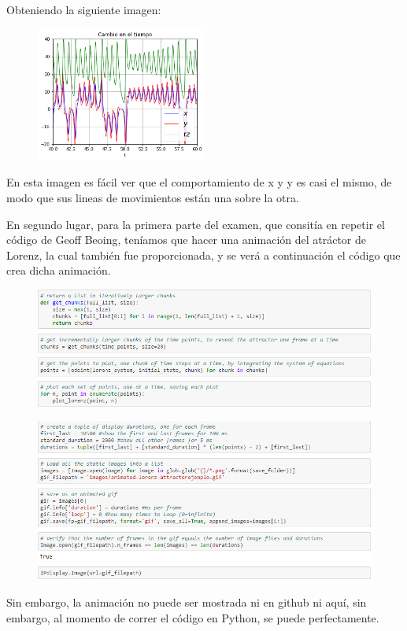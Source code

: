 \documentclass{article}
\begin{document}
Obteniendo la siguiente imagen:
\begin{figure}[H]
    \includegraphics[width=0.5\textwidth]{Grafica2.png}
    \centering
    \label{Grad}
\end{figure}
En esta imagen es fácil ver que el comportamiento de x y y es casi el mismo, de modo que sus lineas de movimientos están una sobre la otra.

En segundo lugar, para la primera parte del examen, que consitía en repetir el código de Geoff Beoing, teníamos que hacer una animación del atráctor de Lorenz, la cual también fue proporcionada, y se verá a continuación el código que crea dicha animación.
\begin{figure}[H]
    \includegraphics[width=1\textwidth]{Celda8.PNG}
    \centering
    \label{Cod}
\end{figure}
\begin{figure}[H]
    \includegraphics[width=1\textwidth]{Celda9.PNG}
    \centering
    \label{Cod}
\end{figure}
Sin embargo, la animación no puede ser mostrada ni en github ni aquí, sin embargo, al momento de correr el código en Python, se puede perfectamente.
\end{document}
